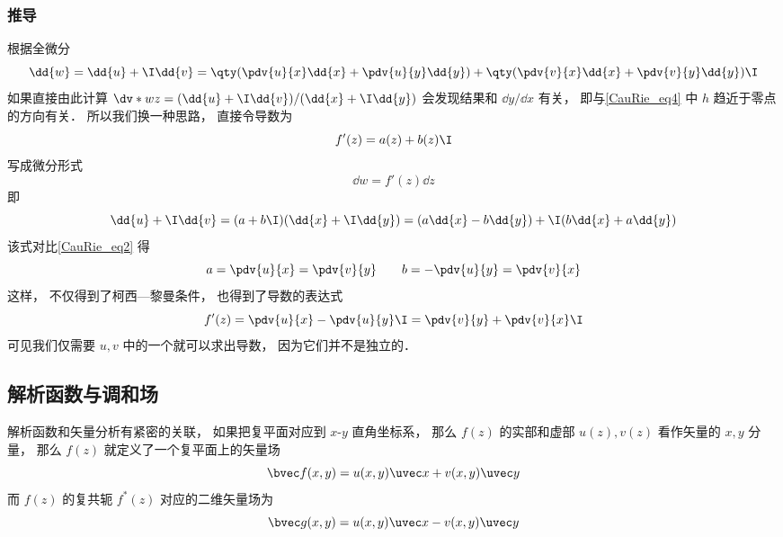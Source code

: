 \subsubsection{推导}
根据全微分
\begin{equation}\label{CauRie_eq2}
\dd{w} = \dd{u} + \I \dd{v} = \qty(\pdv{u}{x} \dd{x} + \pdv{u}{y} \dd{y}) + \qty(\pdv{v}{x} \dd{x} + \pdv{v}{y} \dd{y})\I
\end{equation}
如果直接由此计算 $\dv*{w}{z} = (\dd{u} + \I \dd{v})/(\dd{x} + \I \dd{y})$ 会发现结果和 $\dd{y}/\dd{x}$ 有关， 即与\autoref{CauRie_eq4} 中 $h$ 趋近于零点的方向有关． 所以我们换一种思路， 直接令导数为
\begin{equation}
f'(z) = a(z) + b(z)\I
\end{equation}
写成微分形式
\begin{equation}
\dd{w} = f'(z)\dd{z}
\end{equation}
即
\begin{equation}
\dd{u} + \I \dd{v} = (a + b\I)(\dd{x} + \I\dd{y}) = (a \dd{x} - b\dd{y}) + \I (b \dd{x} + a\dd{y})
\end{equation}
该式对比\autoref{CauRie_eq2} 得
\begin{equation}
a = \pdv{u}{x} = \pdv{v}{y} \qquad
b = -\pdv{u}{y} = \pdv{v}{x}
\end{equation}
这样， 不仅得到了柯西—黎曼条件， 也得到了导数的表达式
\begin{equation}
f'(z) = \pdv{u}{x} -\pdv{u}{y} \I = \pdv{v}{y} + \pdv{v}{x}\I
\end{equation}
可见我们仅需要 $u, v$ 中的一个就可以求出导数， 因为它们并不是独立的．


\subsection{解析函数与调和场}

解析函数和矢量分析有紧密的关联， 如果把复平面对应到 $x$-$y$ 直角坐标系， 那么 $f(z)$ 的实部和虚部 $u(z), v(z)$ 看作矢量的 $x,y$ 分量， 那么 $f(z)$ 就定义了一个复平面上的矢量场
\begin{equation}
\bvec f(x,y) = u(x,y)\uvec x + v(x,y)\uvec y
\end{equation}
而 $f(z)$ 的复共轭 $f^*(z)$ 对应的二维矢量场为
\begin{equation}
\bvec g(x,y) = u(x,y)\uvec x - v(x,y)\uvec y
\end{equation}

